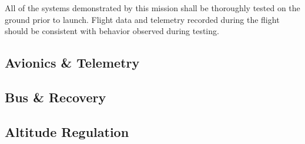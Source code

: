 All of the systems demonstrated by this mission shall be thoroughly tested
on the ground prior to launch. Flight data and telemetry recorded during the
flight should be consistent with behavior observed during testing. 

\subsection{Avionics \& Telemetry}

\subsection{Bus \& Recovery}

\subsection{Altitude Regulation}